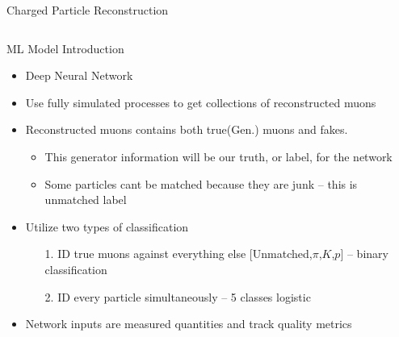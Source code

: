 \documentclass[10pt,handout]{beamer}
\begin{document}
\begin{frame}{Charged Particle Reconstruction}
\begin{columns}
\begin{column}{0.5\textwidth}
\end{column}
\end{columns}



\end{frame}

\begin{frame}{ML Model Introduction}
\begin{itemize}
\item Deep Neural Network\\

\item Use fully simulated processes to get collections of reconstructed muons\\

\item Reconstructed muons contains both true(Gen.) muons and fakes.\\
\begin{itemize}
\item This generator information will be our truth, or label, for the network
\item Some particles cant be matched because they are junk -- this is unmatched label
\end{itemize}

\item Utilize two types of classification\\ 
\begin{itemize}
\item[1.] ID true muons against everything else [Unmatched,$\pi$,$K$,$p$] -- binary classification\\

\item[2.] ID every particle simultaneously -- 5 classes logistic
\end{itemize}
\item Network inputs are measured quantities and track quality metrics

\end{itemize}
\end{frame}
\end{document}
